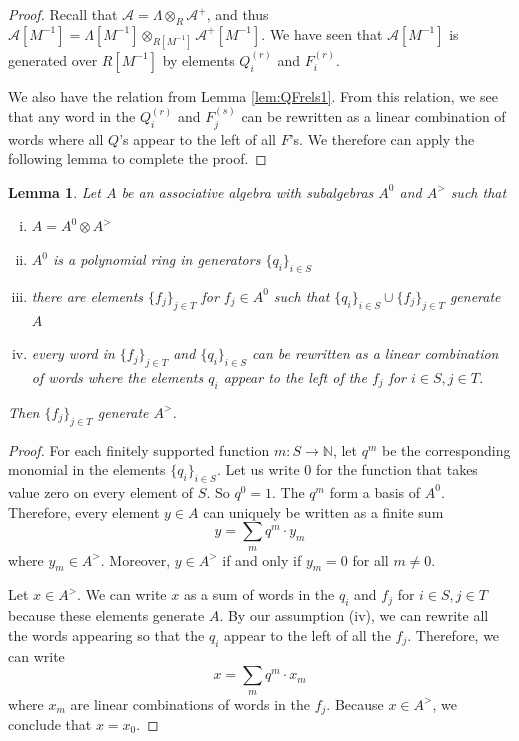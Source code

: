\documentclass[11pt,reqno]{amsart}
\numberwithin{equation}{section}
\newtheorem{Lemma}[equation]{Lemma}
\theoremstyle{definition}
\newcommand{\cA}{\mathcal{A}}
\newcommand{\NN}{\mathbb{N}}
\newcommand{\GT}{\Lambda}
\newcommand{\base}{R}
\newcommand{\qzast}{\cA}
\newcommand{\qzastplus}{\cA^{+}}
\begin{document}
\begin{proof}
  Recall that $\qzast = \GT\otimes_\base \qzastplus$, and thus $\qzast[M^{-1}] = \GT[M^{-1}] \otimes_{\base[M^{-1}]} \qzastplus[M^{-1}]$. We have seen that $\qzast[M^{-1}]$ is generated over $\base[M^{-1}]$ by elements $Q_i^{(r)}$ and $F_i^{(r)}$.
  
  We also have the relation from Lemma \eqref{lem:QFrels1}. From this relation, we see that any word in the $Q_i^{(r)}$ and $F_j^{(s)}$ can be rewritten as a linear combination of words where all $Q$'s appear to the left of all $F$'s. We therefore can apply the following lemma to complete the proof.
\end{proof}


\begin{Lemma}
  Let $A$ be an associative algebra with subalgebras $A^0$ and $A^>$ such that
  \begin{enumerate}[(i)]
  \item $A = A^0 \otimes A^>$
  \item $A^0$ is a polynomial ring in generators $\{q_i\}_{i \in S}$ 
  \item there are elements $\{f_j\}_{j \in T}$ for $f_j \in A^0$ such that $\{q_i\}_{i \in S} \cup \{f_j\}_{j \in T}$ generate $A$
  \item every word in $\{f_j\}_{j \in T}$ and $\{q_i\}_{i \in S}$ can be rewritten as a linear combination of words where the elements $q_i$ appear to the left of the $f_j$ for $i \in S, j\in T$.
  \end{enumerate}
 Then $\{f_j\}_{j \in T}$ generate $A^>$.
\end{Lemma}

\begin{proof}
  For each finitely supported function $m : S \rightarrow \NN$, let $q^m$ be the corresponding monomial in the elements $\{q_i\}_{i \in S}$. Let us write $0$ for the function that takes value zero on every element of $S$. So $q^0 =1$. The $q^m$ form a basis of $A^0$. Therefore, every element $y \in A$ can uniquely be written as a finite sum
  \begin{equation}
    \label{eq:27}
    y = \sum_{m} q^m \cdot y_m
  \end{equation}
  where $y_m \in A^{>}$. Moreover, $y \in A^>$ if and only if $y_m = 0$ for all $m \neq 0$.

  Let $x \in A^>$. We can write $x$ as a sum of words in the $q_i$ and $f_j$ for $i \in S, j\in T$ because these elements generate $A$. By our assumption (iv), we can rewrite all the words appearing so that the $q_i$ appear to the left of all the $f_j$. Therefore, we can write
  \begin{equation}
    \label{eq:28}
    x = \sum_{m} q^m \cdot x_m
  \end{equation}
  where $x_m$ are linear combinations of words in the $f_j$. Because $x \in A^>$, we conclude that $x = x_0$.
\end{proof}
\end{document}
